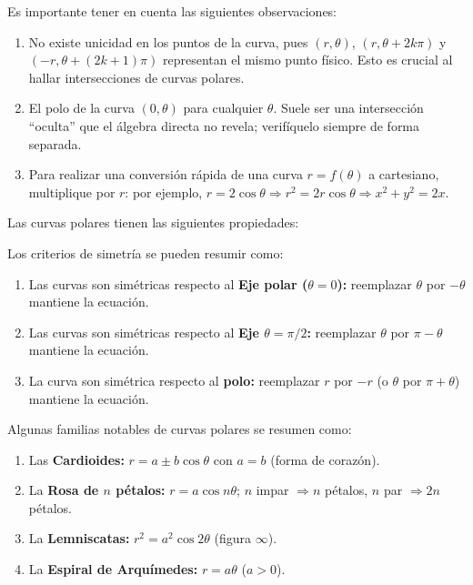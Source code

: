 \begin{rem} Es importante tener en cuenta las siguientes observaciones:
\begin{enumerate} 
  \item No existe unicidad en los puntos de la curva, pues $(r,\theta)$, $(r,\theta + 2k\pi)$ y
    $(-r,\theta + (2k+1)\pi)$ representan el mismo punto físico.
    Esto es crucial al hallar intersecciones de curvas polares.
  \item El polo de la curva $(0,\theta)$ para cualquier $\theta$. Suele ser una
    intersección ``oculta'' que el álgebra directa no revela; verifíquelo
    siempre de forma separada.
  \item Para realizar una conversión rápida de una curva $r = f(\theta)$ a cartesiano,
    multiplique por $r$: por ejemplo, $r = 2\cos\theta \Rightarrow
    r^2 = 2r\cos\theta \Rightarrow x^2+y^2 = 2x$.
\end{enumerate}
\end{rem}

Las curvas polares tienen las siguientes propiedades:
\begin{rem} Los criterios de simetría se pueden resumir como:

\begin{enumerate} 
  \item Las curvas son simétricas respecto al \textbf{Eje polar ($\theta = 0$):} reemplazar $\theta$ por $-\theta$
        mantiene la ecuación.
  \item Las curvas son simétricas respecto al \textbf{Eje $\theta = \pi/2$:} reemplazar $\theta$ por $\pi - \theta$
        mantiene la ecuación.
  \item La curva son simétrica respecto al \textbf{polo:} reemplazar $r$ por $-r$ (o $\theta$ por $\pi + \theta$)
        mantiene la ecuación.
\end{enumerate}
\end{rem}

\begin{rem} Algunas familias notables de curvas polares se resumen como:
\begin{enumerate} 
  \item Las \textbf{Cardioides:} $r = a \pm b\cos\theta$ con $a = b$
        (forma de corazón).
  \item La \textbf{Rosa de $n$ pétalos:} $r = a\cos n\theta$;
        $n$ impar $\Rightarrow n$ pétalos, $n$ par $\Rightarrow 2n$ pétalos.
  \item La \textbf{Lemniscatas:} $r^2 = a^2\cos 2\theta$ (figura $\infty$).
  \item La \textbf{Espiral de Arquímedes:} $r = a\theta$ ($a > 0$).
\end{enumerate}
\end{rem}


